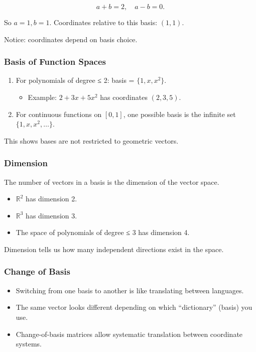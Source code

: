 \documentclass[
  letterpaper,
  DIV=11,
  numbers=noendperiod]{scrreprt}
\providecommand{\tightlist}{%
  \setlength{\itemsep}{0pt}\setlength{\parskip}{0pt}}
\begin{document}
\[
a + b = 2, \quad a - b = 0.
\]

So \(a=1, b=1\). Coordinates relative to this basis: \((1,1)\).

Notice: coordinates depend on basis choice.

\subsubsection{Basis of Function Spaces}\label{basis-of-function-spaces}

\begin{enumerate}
\def\labelenumi{\arabic{enumi}.}
\item
  For polynomials of degree ≤ 2: basis = \(\{1, x, x^2\}\).

  \begin{itemize}
  \tightlist
  \item
    Example: \(2 + 3x + 5x^2\) has coordinates \((2,3,5)\).
  \end{itemize}
\item
  For continuous functions on \([0,1]\), one possible basis is the
  infinite set \(\{1, x, x^2, \dots\}\).
\end{enumerate}

This shows bases are not restricted to geometric vectors.

\subsubsection{Dimension}\label{dimension}

The number of vectors in a basis is the dimension of the vector space.

\begin{itemize}
\tightlist
\item
  \(\mathbb{R}^2\) has dimension 2.
\item
  \(\mathbb{R}^3\) has dimension 3.
\item
  The space of polynomials of degree ≤ 3 has dimension 4.
\end{itemize}

Dimension tells us how many independent directions exist in the space.

\subsubsection{Change of Basis}\label{change-of-basis}

\begin{itemize}
\tightlist
\item
  Switching from one basis to another is like translating between
  languages.
\item
  The same vector looks different depending on which ``dictionary''
  (basis) you use.
\item
  Change-of-basis matrices allow systematic translation between
  coordinate systems.
\end{itemize}
\end{document}

